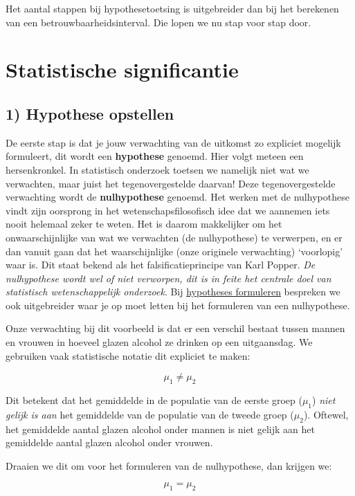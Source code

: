 \documentclass[
  letterpaper,
  DIV=11,
  numbers=noendperiod]{scrreprt}
\begin{document}
Het aantal stappen bij hypothesetoetsing is uitgebreider dan bij het
berekenen van een betrouwbaarheidsinterval. Die lopen we nu stap voor
stap door.

\section{Statistische
significantie}\label{sec-statistischesignificantie}

\subsection{1) Hypothese opstellen}\label{sec-opstellenhypo}

De eerste stap is dat je jouw verwachting van de uitkomst zo expliciet
mogelijk formuleert, dit wordt een \textbf{hypothese} genoemd. Hier
volgt meteen een hersenkronkel. In statistisch onderzoek toetsen we
namelijk niet wat we verwachten, maar juist het tegenovergestelde
daarvan! Deze tegenovergestelde verwachting wordt de
\textbf{nulhypothese} genoemd. Het werken met de nulhypothese vindt zijn
oorsprong in het wetenschapsfilosofisch idee dat we aannemen iets nooit
helemaal zeker te weten. Het is daarom makkelijker om het
onwaarschijnlijke van wat we verwachten (de nulhypothese) te verwerpen,
en er dan vanuit gaan dat het waarschijnlijke (onze originele
verwachting) `voorlopig' waar is. Dit staat bekend als het
falsificatieprincipe van Karl Popper. \emph{De nulhypothese wordt wel of
niet verworpen, dit is in feite het centrale doel van statistisch
wetenschappelijk onderzoek}. Bij
\hyperref[sec-hypoformuleren]{hypotheses formuleren} bespreken we ook
uitgebreider waar je op moet letten bij het formuleren van een
nulhypothese.

Onze verwachting bij dit voorbeeld is dat er een verschil bestaat tussen
mannen en vrouwen in hoeveel glazen alcohol ze drinken op een
uitgaansdag. We gebruiken vaak statistische notatie dit expliciet te
maken:

\[\mu_1 \neq \mu_2 \]

Dit betekent dat het gemiddelde in de populatie van de eerste groep
(\(\mu_1\)) \emph{niet gelijk is aan} het gemiddelde van de populatie
van de tweede groep (\(\mu_2\)). Oftewel, het gemiddelde aantal glazen
alcohol onder mannen is niet gelijk aan het gemiddelde aantal glazen
alcohol onder vrouwen.

Draaien we dit om voor het formuleren van de nulhypothese, dan krijgen
we:

\[\mu_1=\mu_2\]
\end{document}
